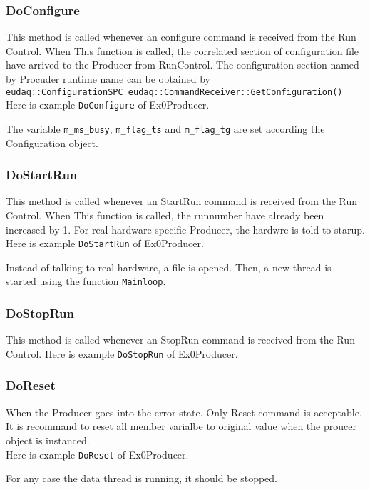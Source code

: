\subsubsection{DoConfigure}
This method is called whenever an configure command is received from the Run Control. When This function is called, the correlated section of configuration file have arrived to the Producer from RunControl. The configuration section named by Procuder runtime name can be obtained by \\
\lstinline[style=cpp]{eudaq::ConfigurationSPC eudaq::CommandReceiver::GetConfiguration()} \\

Here is example \lstinline[style=cpp]{DoConfigure} of Ex0Producer.

The variable \lstinline[style=cpp]{m_ms_busy}, \lstinline[style=cpp]{m_flag_ts} and \lstinline[style=cpp]{m_flag_tg} are set according the Configuration object.

\subsubsection{DoStartRun}\label{sec:ex0prdstart}
This method is called whenever an StartRun command is received from the Run Control. When This function is called, the runnumber have already been increased by 1. For real hardware specific Producer, the hardwre is told to starup.
Here is example \lstinline[style=cpp]{DoStartRun} of Ex0Producer.

Instead of talking to real hardware, a file is opened. Then, a new thread is started using the function \lstinline[style=cpp]{Mainloop}.

\subsubsection{DoStopRun}
This method is called whenever an StopRun command is received from the Run Control. Here is example \lstinline[style=cpp]{DoStopRun} of Ex0Producer.


\subsubsection{DoReset}
When the Producer goes into the error state. Only Reset command is acceptable. It is recommand to reset all member varialbe to original value when the proucer object is instanced.\\
Here is example \lstinline[style=cpp]{DoReset} of Ex0Producer. 

For any case the data thread is running, it should be stopped.

